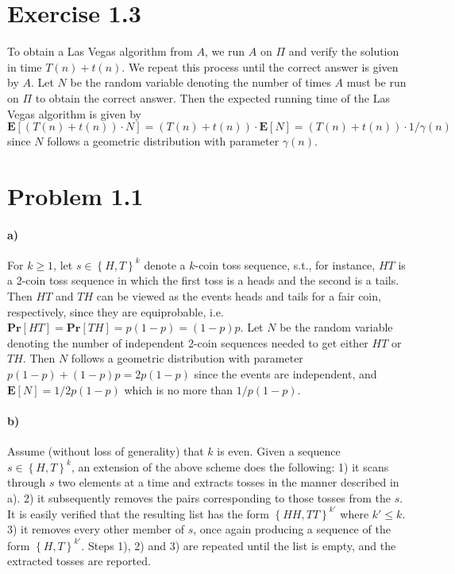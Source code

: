 \documentclass[12pt]{article}
\begin{document}
\section*{Exercise 1.3}
To obtain a Las Vegas algorithm from $A$, we run $A$ on $\Pi$ and verify the solution in time $T(n) + t(n)$. We repeat this process until the correct answer is given by $A$. Let $N$ be the random variable denoting the number of times $A$ must be run on $\Pi$ to obtain the correct answer. Then the expected running time of the Las Vegas algorithm is given by $\mathbf{E}\left[ \left(T(n) + t(n)\right) \cdot N \right] = \left(T(n) + t(n)\right) \cdot \mathbf{E} \left[ N \right] = \left(T(n) + t(n)\right) \cdot 1/\gamma{(n)}$ since $N$ follows a geometric distribution with parameter $\gamma{(n)}$.

\section*{Problem 1.1}
\paragraph{a)} For $k \geq 1$, let $s \in \left\{ H,T \right\}^k$ denote a $k$-coin toss sequence, s.t., for instance, $HT$ is a 2-coin toss sequence in which the first toss is a heads and the second is a tails. Then $HT$ and $TH$ can be viewed as the events heads and tails for a fair coin, respectively, since they are equiprobable, i.e. $\textbf{Pr}\left[ HT \right] = \textbf{Pr}\left[ TH \right] = p(1-p)=(1-p)p$. Let $N$ be the random variable denoting the number of independent 2-coin sequences needed to get either $HT$ or $TH$. Then $N$ follows a geometric distribution with parameter $p(1-p) + (1-p)p = 2p(1-p)$ since the events are independent, and $\mathbf{E}\left[ N \right] = 1/2p(1-p)$ which is no more than $1/p(1-p)$.

\paragraph{b)} Assume (without loss of generality) that $k$ is even. Given a sequence $s \in \left\{ H,T \right\}^k$, an extension of the above scheme does the following: 1) it scans through $s$ two elements at a time and extracts tosses in the manner described in a). 2) it subsequently removes the pairs corresponding to those tosses from the $s$. It is easily verified that the resulting list has the form $\left\{ HH,TT \right\}^{k'}$ where $k' \leq k$. 3) it removes every other member of $s$, once again producing a sequence of the form $\left\{ H,T \right\}^{k'}$. Steps 1), 2) and 3) are repeated until the list is empty, and the extracted tosses are reported.
\end{document}
